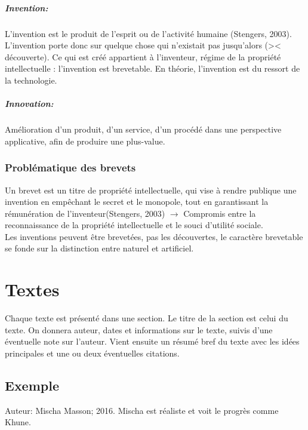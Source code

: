 \documentclass{report}
\begin{document}
	\paragraph{Invention:} L’invention \og est le produit de l’esprit ou de l’activité humaine \fg (Stengers, 2003). L’invention porte donc sur quelque chose qui n’existait pas jusqu'alors (>< découverte). Ce qui est créé appartient à l’inventeur, régime de la propriété intellectuelle : l’invention est brevetable. En théorie, l’invention est du ressort de la technologie.
	
	\paragraph{Innovation:} Amélioration d'un produit, d'un service, d'un procédé dans une perspective applicative, afin de produire une plus-value.
	
	\subsection{Problématique des brevets}
	
	Un brevet est un titre de propriété intellectuelle, qui \og vise à rendre publique une invention en empêchant le secret et le monopole, tout en garantissant la rémunération de l’inventeur\fg (Stengers, 2003) $\rightarrow$ Compromis entre la reconnaissance de la propriété intellectuelle et le souci d’utilité sociale.\\
	Les inventions peuvent être brevetées, pas les découvertes, le caractère brevetable se fonde sur la distinction entre naturel et artificiel.
	
	\appendix
	
	\chapter{Textes}
	
	Chaque texte est présenté dans une section. Le titre de la section est celui du texte. On donnera auteur, dates et informations sur le texte, suivis d'une éventuelle note sur l'auteur. Vient ensuite un résumé bref du texte avec les idées principales et une ou deux éventuelles citations.
	
	\section{Exemple}
	Auteur: Mischa Masson; 2016. Mischa est réaliste et voit le progrès comme Khune.
	
\end{document}
